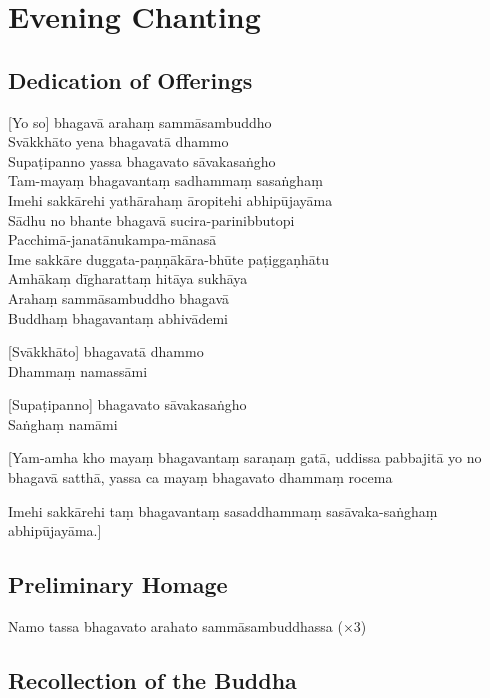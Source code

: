 \chapter{Evening Chanting}

\section*{Dedication of Offerings}


[Yo so] bhagavā arahaṃ sammāsambuddho\\
Svākkhāto yena bhagavatā dhammo\\
Supaṭipanno yassa bhagavato sāvakasaṅgho\\
Tam-mayaṃ bhagavantaṃ sadhammaṃ sasaṅghaṃ\\
Imehi sakkārehi yathārahaṃ āropitehi abhipūjayāma\\
Sādhu no bhante bhagavā sucira-parinibbutopi\\
Pacchimā-janatānukampa-mānasā\\
Ime sakkāre duggata-paṇṇākāra-bhūte paṭiggaṇhātu\\
Amhākaṃ dīgharattaṃ hitāya sukhāya\\
Arahaṃ sammāsambuddho bhagavā\\
Buddhaṃ bhagavantaṃ abhivādemi

[Svākkhāto] bhagavatā dhammo\\
Dhammaṃ namassāmi

[Supaṭipanno] bhagavato sāvakasaṅgho\\
Saṅghaṃ namāmi

[Yam-amha kho mayaṃ bhagavantaṃ saraṇaṃ gatā, uddissa pabbajitā yo no bhagavā
satthā, yassa ca mayaṃ bhagavato dhammaṃ rocema

Imehi sakkārehi taṃ bhagavantaṃ sasaddhammaṃ sasāvaka-saṅghaṃ abhipūjayāma.]

\section*{Preliminary Homage}

\begin{leader}
\end{leader}

Namo tassa bhagavato arahato sammāsambuddhassa (×3)

\section*{Recollection of the Buddha}

